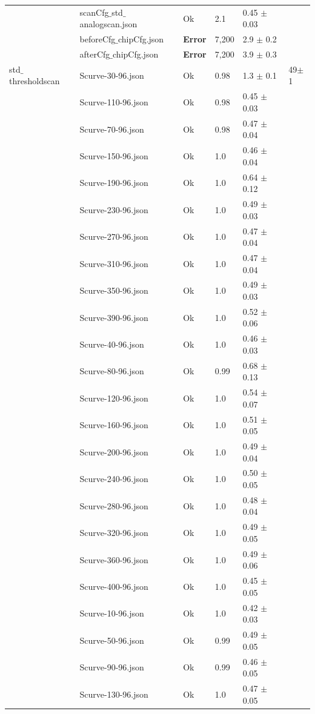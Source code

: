 {\begin{longtable}{|llllll|}
 & scanCfg$\_$std$\_$analogscan.json & Ok & 2.1 & 0.45 $\pm$ 0.03 & \\
 & beforeCfg$\_$chipCfg.json & { \bf Error} & 7,200 & 2.9 $\pm$ 0.2 & \\
 & afterCfg$\_$chipCfg.json & { \bf Error} & 7,200 & 3.9 $\pm$ 0.3 & \\
\hline
std$\_$thresholdscan & Scurve-30-96.json & Ok & 0.98 & 1.3 $\pm$ 0.1 & 49$\pm$1\\
 & Scurve-110-96.json & Ok & 0.98 & 0.45 $\pm$ 0.03 & \\
 & Scurve-70-96.json & Ok & 0.98 & 0.47 $\pm$ 0.04 & \\
 & Scurve-150-96.json & Ok & 1.0 & 0.46 $\pm$ 0.04 & \\
 & Scurve-190-96.json & Ok & 1.0 & 0.64 $\pm$ 0.12 & \\
 & Scurve-230-96.json & Ok & 1.0 & 0.49 $\pm$ 0.03 & \\
 & Scurve-270-96.json & Ok & 1.0 & 0.47 $\pm$ 0.04 & \\
 & Scurve-310-96.json & Ok & 1.0 & 0.47 $\pm$ 0.04 & \\
 & Scurve-350-96.json & Ok & 1.0 & 0.49 $\pm$ 0.03 & \\
 & Scurve-390-96.json & Ok & 1.0 & 0.52 $\pm$ 0.06 & \\
 & Scurve-40-96.json & Ok & 1.0 & 0.46 $\pm$ 0.03 & \\
 & Scurve-80-96.json & Ok & 0.99 & 0.68 $\pm$ 0.13 & \\
 & Scurve-120-96.json & Ok & 1.0 & 0.54 $\pm$ 0.07 & \\
 & Scurve-160-96.json & Ok & 1.0 & 0.51 $\pm$ 0.05 & \\
 & Scurve-200-96.json & Ok & 1.0 & 0.49 $\pm$ 0.04 & \\
 & Scurve-240-96.json & Ok & 1.0 & 0.50 $\pm$ 0.05 & \\
 & Scurve-280-96.json & Ok & 1.0 & 0.48 $\pm$ 0.04 & \\
 & Scurve-320-96.json & Ok & 1.0 & 0.49 $\pm$ 0.05 & \\
 & Scurve-360-96.json & Ok & 1.0 & 0.49 $\pm$ 0.06 & \\
 & Scurve-400-96.json & Ok & 1.0 & 0.45 $\pm$ 0.05 & \\
 & Scurve-10-96.json & Ok & 1.0 & 0.42 $\pm$ 0.03 & \\
 & Scurve-50-96.json & Ok & 0.99 & 0.49 $\pm$ 0.05 & \\
 & Scurve-90-96.json & Ok & 0.99 & 0.46 $\pm$ 0.05 & \\
 & Scurve-130-96.json & Ok & 1.0 & 0.47 $\pm$ 0.05 & \\

\end{longtable}}

